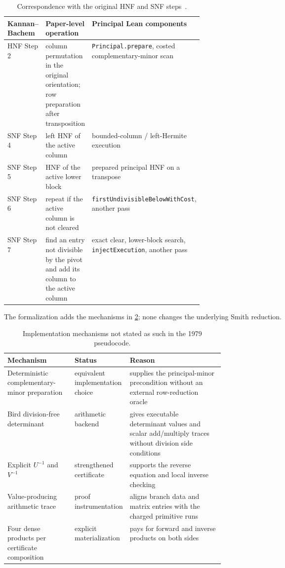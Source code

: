 \documentclass[11pt]{article}
\theoremstyle{definition}
\newcommand{\decl}[1]{\nolinkurl{#1}}
\begin{document}
\begin{table}[ht]
\centering
\footnotesize
\begin{tabularx}{\linewidth}{@{}p{0.16\linewidth}p{0.30\linewidth}X@{}}
\toprule
Kannan--Bachem & Paper-level operation & Principal Lean components \\
\midrule
HNF Step 2 & column permutation in the original orientation; row preparation after transposition & \decl{Principal.prepare}, costed complementary-minor scan \\
SNF Step 4 & left HNF of the active column & bounded-column / left-Hermite execution \\
SNF Step 5 & HNF of the active lower block & prepared principal HNF on a transpose \\
SNF Step 6 & repeat if the active column is not cleared & \decl{firstUndivisibleBelowWithCost}, another pass \\
SNF Step 7 & find an entry not divisible by the pivot and add its column to the active column & exact clear, lower-block search, \decl{injectExecution}, another pass \\
\bottomrule
\end{tabularx}
\caption{Correspondence with the original HNF and SNF steps~\protect\cite{kannan1979}.}
\label{tab:kbmap}
\end{table}

The formalization adds the mechanisms in \cref{tab:changes}; none changes the underlying Smith reduction.

\begin{table}[ht]
\centering
\footnotesize
\begin{tabularx}{\linewidth}{@{}p{0.31\linewidth}p{0.20\linewidth}X@{}}
\toprule
Mechanism & Status & Reason \\
\midrule
Deterministic complementary-minor preparation & equivalent implementation choice & supplies the principal-minor precondition without an external row-reduction oracle \\
Bird division-free determinant & arithmetic backend & gives executable determinant values and scalar add/multiply traces without division side conditions \\
Explicit $U^{-1}$ and $V^{-1}$ & strengthened certificate & supports the reverse equation and local inverse checking \\
Value-producing arithmetic trace & proof instrumentation & aligns branch data and matrix entries with the charged primitive runs \\
Four dense products per certificate composition & explicit materialization & pays for forward and inverse products on both sides \\
\bottomrule
\end{tabularx}
\caption{Implementation mechanisms not stated as such in the 1979 pseudocode.}
\label{tab:changes}
\end{table}
\end{document}
